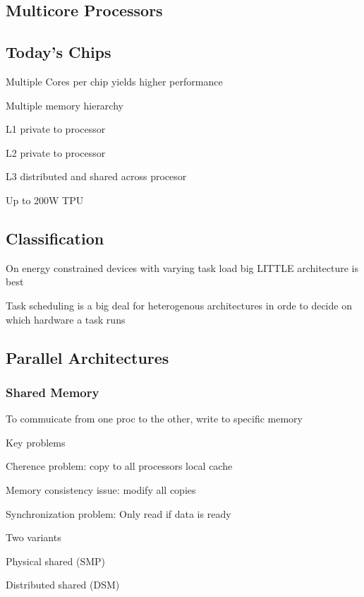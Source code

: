 \documentclass[a4paper, fontsize=8pt, landscape, DIV=1]{scrartcl}
\makeatletter
\renewenvironment{outline}[1][]{%
  \ifthenelse{\equal{#1}{}}{}{\renewcommand{\ol@type}{#1}}%
  \ol@z%
  \newcommand{\0}{\ol@toz\ol@z}%
  \newcommand{\1}{\vspace{\dimexpr\outlinespacingscalar\baselineskip-\baselineskip}\ol@toi\ol@i\item}%
  \newcommand{\2}{\vspace{\dimexpr\outlinespacingscalartwo\baselineskip-\baselineskip}\ol@toii\ol@ii\item}%
  \newcommand{\3}{\vspace{\dimexpr\outlinespacingscalar\baselineskip-\baselineskip}\ol@toiii\ol@iii\item}%
  \newcommand{\4}{\vspace{\dimexpr\outlinespacingscalar\baselineskip-\baselineskip}\ol@toiiii\ol@iiii\item}%
}{%
  \ol@toz\ol@exit%
}
\def\outlinespacingscalar{0.5}
\def\outlinespacingscalartwo{0.5}
\makeatother
\begin{document}
\begin{multicols*}{4}
  \vfill\null
  \columnbreak
  \section{Multicore Processors}
  \subsection{Today's Chips}
  \begin{outline}
    \1 Multiple Cores per chip yields higher performance
    \1 Multiple memory hierarchy
      \2 L1 private to processor
      \2 L2 private to processor
      \2 L3 distributed and shared across procesor
    \1 Up to 200W TPU
  \end{outline}

  \subsection{Classification}
  \begin{outline}
    \1 On energy constrained devices with varying task load big LITTLE architecture is best
    \1 Task scheduling is a big deal for heterogenous architectures in orde to
    decide on which hardware a task runs
  \end{outline}


  \subsection{Parallel Architectures}
  
  \subsubsection{Shared Memory}
  \begin{outline}
    \1 To commuicate from one proc to the other, write to specific memory
    \1 Key problems
      \2 Cherence problem: copy to all processors local cache
      \2 Memory consistency issue: modify all copies
      \2 Synchronization problem: Only read if data is ready
    \1 Two variants
      \2 Physical shared (SMP)
      \2 Distributed shared (DSM)
  \end{outline}


\end{multicols*}
\end{document}
